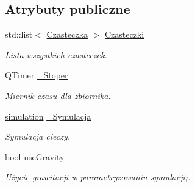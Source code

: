 \subsection*{Atrybuty publiczne}
\begin{DoxyCompactItemize}
\item 
std\+::list$<$ \hyperlink{class_czasteczka}{Czasteczka} $>$ \hyperlink{class_zbiornik_a751209f2f02a7eaf3b7a3283d8fcd3ad}{Czasteczki}
\begin{DoxyCompactList}\small\item\em Lista wszystkich czasteczek. \end{DoxyCompactList}\item 
Q\+Timer \hyperlink{class_zbiornik_a5ca8ac1357ef59110d4a9e12aae2bd99}{\+\_\+\+Stoper}
\begin{DoxyCompactList}\small\item\em Miernik czasu dla zbiornika. \end{DoxyCompactList}\item 
\hyperlink{classsimulation}{simulation} \hyperlink{class_zbiornik_a2d1f5a0b8fb0085afcd66b730d6dd6a8}{\+\_\+\+Symulacja}
\begin{DoxyCompactList}\small\item\em Symulacja cieczy. \end{DoxyCompactList}\item 
bool \hyperlink{class_zbiornik_adf42e0df5f2af3160a1ff2e1360efe8a}{use\+Gravity}
\begin{DoxyCompactList}\small\item\em Użycie grawitacji w parametryzowaniu symulacji;. \end{DoxyCompactList}\end{DoxyCompactItemize}

